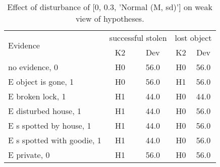 \begin{table}\begin{tabular}{l|cc|cc}\toprule\multirow{2}{*}{Evidence} & \multicolumn{2}{c}{successful stolen}& \multicolumn{2}{c}{lost object}\\& {K2} & {Dev}& {K2} & {Dev}\\\midrule
no evidence, 0 & \cellcolor{Bittersweet}H0&\cellcolor{Bittersweet}56.0&\cellcolor{Bittersweet}H0&\cellcolor{Bittersweet}56.0\\E object is gone, 1 & \cellcolor{Bittersweet}H0&\cellcolor{Bittersweet}56.0&\cellcolor{Bittersweet}H1&\cellcolor{Bittersweet}56.0\\E broken lock, 1 & \cellcolor{Bittersweet}H1&\cellcolor{Bittersweet}44.0&\cellcolor{Bittersweet}H0&\cellcolor{Bittersweet}44.0\\E disturbed house, 1 & \cellcolor{Bittersweet}H1&\cellcolor{Bittersweet}44.0&\cellcolor{Bittersweet}H0&\cellcolor{Bittersweet}56.0\\E s spotted by house, 1 & \cellcolor{Bittersweet}H1&\cellcolor{Bittersweet}44.0&\cellcolor{Bittersweet}H0&\cellcolor{Bittersweet}56.0\\E s spotted with goodie, 1 & \cellcolor{Bittersweet}H1&\cellcolor{Bittersweet}44.0&\cellcolor{Bittersweet}H0&\cellcolor{Bittersweet}56.0\\E private, 0 & \cellcolor{Bittersweet}H1&\cellcolor{Bittersweet}56.0&\cellcolor{Bittersweet}H0&\cellcolor{Bittersweet}56.0\\\bottomrule\end{tabular}\caption{Effect of disturbance of [0, 0.3, 'Normal (M, sd)'] on weak view of hypotheses.}\end{table}